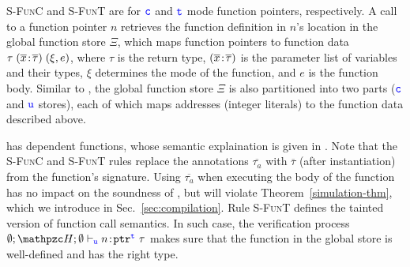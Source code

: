 {\textsc{S-FunC} and \textsc{S-FunT} are
for $\textcolor{blue}{\texttt{c}}$ and $\textcolor{blue}{\texttt{t}}$ mode function pointers, respectively. 
A call to a function pointer $n$ retrieves
 the function definition in $n$'s location in the global function store $\Xi$,
which maps function pointers to
function data $\tau\;({\overline{x}}\!:\!{\overline{\tau}})\;(\xi,e)$, where
$\tau$ is the return type, $({\overline{x}}\!:\!{\overline{\tau}})$
is the parameter list of variables and their types, 
$\xi$ determines the mode of the function, and $e$ is the
function body. 
Similar to \heap, the global function store $\Xi$ is also partitioned into
two parts ($\textcolor{blue}{\texttt{c}}$ and $\textcolor{blue}{\texttt{u}}$ stores), each of which
maps addresses (integer literals) to the function data described above.

\systemname{} has dependent functions, whose semantic explaination is given in .
Note that the \textsc{S-FunC} and \textsc{S-FunT} rules replace the
  annotations $\overline{\tau_a}$ with
  $\overline{\tau}$ (after instantiation) from the function's
  signature. Using $\overline{\tau_a}$ when executing the body of
the function has no impact on the soundness of \systemname, but will violate
Theorem~\ref{simulation-thm}, which we introduce in Sec.~\ref{sec:compilation}.
Rule \textsc{S-FunT} defines the tainted version of function call semantics.
In such case, the verification process 
$\emptyset;\heap ; \emptyset \vdash_{\umode}\evalue{n}{\tptr{\tau}{\tmode}}$
makes sure that the function in the global store is well-defined and has the right type.




}
